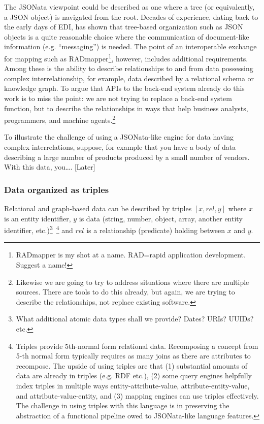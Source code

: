 \documentclass[9pt,letterpaper]{article}
\begin{document}
The JSONata viewpoint could be described as one where a tree (or equivalently, a JSON object) is navigated from the root.
Decades of experience, dating back to the early days of EDI, has shown that tree-based organization such as JSON objects is a quite reasonable choice where the communication of document-like information (e.g. ``messaging'') is needed.
The point of an interoperable exchange for mapping such as RADmapper\footnote{RADmapper is my shot at a name. RAD=rapid application development. Suggest a name!}, however, includes additional requirements.
Among these is the ability to describe relationships to and from data possessing complex interrelationship, for example, data described by a relational schema or knowledge graph.
To argue that APIs to the back-end system already do this work is to miss the point:
we are not trying to replace a back-end system function, but to describe the relationships in ways that help business analysts, programmers, and machine agents.\footnote{Likewise we are going to try to address
  situations where there are multiple sources. There are tools to do this already, but again, we are trying to describe the relationships, not replace existing software.}

To illustrate the challenge of using a JSONata-like engine for data having complex interrelations, suppose, for example that you have a body of data describing a large number of products produced by a small number of vendors.
With this data, you\ldots. [Later]

\subsubsection{Data organized as triples}
Relational and graph-based data can be described by triples $[x,rel,y]$ where $x$ is an entity identifier, $y$ is data (string, number, object, array, another entity identifier, etc.)\footnote{What  additional atomic data
  types shall we provide? Dates? URIs? UUIDs? etc.}~\footnote{Triples provide 5th-normal form relational data. Recomposing a concept from 5-th normal form typically requires as many joins as
  there are attributes to recompose.
  The upside of using triples are that
  (1) substantial amounts of data are already in triples (e.g. RDF etc.),
  (2) some query engines helpfully index triples in multiple ways entity-attribute-value, attribute-entity-value, and attribute-value-entity, and
  (3) mapping engines can use triples effectively.
  The challenge in using triples with this language is in preserving the abstraction of a functional pipeline owed to JSONata-like language features.}
  and $rel$ is a relationship (predicate) holding between $x$ and $y$.
\end{document}
